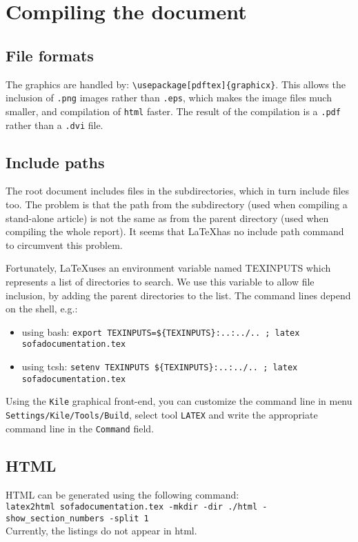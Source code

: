 \documentclass[a4paper,10pt]{report}
\begin{document}
\section{Compiling the document}
\subsection{File formats}
The graphics are handled by: \texttt{\textbackslash usepackage[pdftex]\{graphicx\}}. This allows the inclusion of \texttt{.png} images rather than \texttt{.eps}, which makes the image files much smaller, and compilation of \texttt{html} faster. The result of the compilation is a \texttt{.pdf} rather than a \texttt{.dvi} file.

\subsection{Include paths}
The root document includes files in the subdirectories, which in turn include files too. The problem is that the path from the subdirectory (used when compiling a stand-alone article) is not the same as from the parent directory (used when compiling the whole report).
It seems that \LaTeX has no include path command to circumvent this problem.

Fortunately, \LaTeX uses an environment variable named TEXINPUTS which represents a list of directories to search. We use this variable to allow file inclusion, by adding the parent directories to the list. The command lines depend on the shell, e.g.:
\begin{itemize}
 \item using bash: \texttt{export TEXINPUTS=\$\{TEXINPUTS\}:..:../.. ; latex sofadocumentation.tex}
 \item using tcsh: \texttt{setenv TEXINPUTS \$\{TEXINPUTS\}:..:../.. ; latex sofadocumentation.tex}
\end{itemize}

Using the \texttt{Kile} graphical front-end, you can customize the command line in menu \texttt{Settings/Kile/Tools/Build}, select tool \texttt{LATEX} and write the appropriate command line in the \texttt{Command} field.

\subsection{HTML}
HTML can be generated using the following command:\\
\texttt{latex2html sofadocumentation.tex -mkdir -dir ./html -show\_section\_numbers -split 1}
\\
Currently, the listings do not appear in html.
\end{document}
